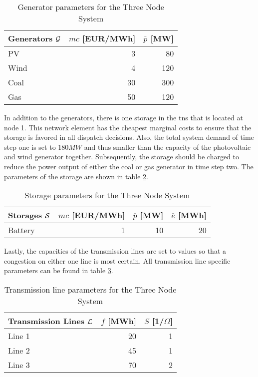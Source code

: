 \begin{table}[h!]
    \centering
    \begin{tabular}{lrr}
        Generators $\mathcal{G}$ & $mc$ [EUR/MWh] & $\overline{p}$ [MW] \\ \toprule
        PV & 3 & 80 \\
        Wind & 4 & 120 \\
        Coal & 30 & 300 \\
        Gas & 50 & 120 \\
        \bottomrule
    \end{tabular}
    \caption{Generator parameters for the Three Node System} \label{tab:res:param-gen}
\end{table}

In addition to the generators, there is one storage in the \gls{tns} that is located at node 1. This network element has the cheapest marginal costs to ensure that the storage is favored in all dispatch decisions. Also, the total system demand of time step one is set to $180 MW$ and thus smaller than the capacity of the photovoltaic and wind generator together. Subsequently, the storage should be charged to reduce the power output of either the coal or gas generator in time step two. The parameters of the storage are shown in table \ref{tab:res:param-stor}.


 \begin{table}[h!]
    \centering
    \begin{tabular}{lrrr}
        Storages $\mathcal{S}$ & $mc$ [EUR/MWh] & $\overline{p}$ [MW] & $\overline{e}$ [MWh] \\ \toprule
        Battery & 1 & 10 & 20 \\
        \bottomrule
    \end{tabular}
    \caption{Storage parameters for the Three Node System} \label{tab:res:param-stor}
\end{table}

Lastly, the capacities of the transmission lines are set to values so that a congestion on either one line is most certain. All transmission line specific parameters can be found in table \ref{tab:res:param-line}.

 \begin{table}[h!]
    \centering
    \begin{tabular}{lrr}
        Transmission Lines $\mathcal{L}$ & $f$ [MWh] & $S$ [1/$\Omega$] \\ \toprule
        Line 1 & 20 & 1 \\
        Line 2 & 45 & 1 \\
        Line 3 & 70 & 2 \\
        \bottomrule
    \end{tabular}
    \caption{Transmission line parameters for the Three Node System}
    \label{tab:res:param-line}
\end{table}

